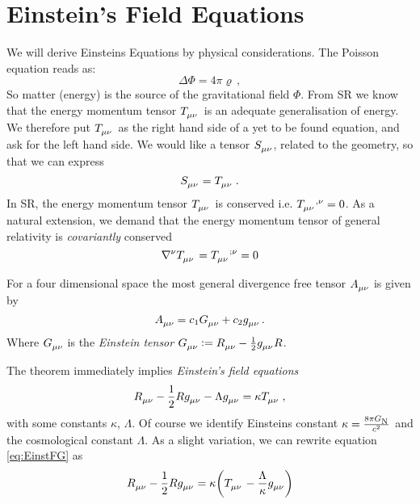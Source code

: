 \chapter{Einstein's Field Equations}
We will derive Einsteins Equations by physical considerations. The Poisson
equation reads as:
\begin{equation}
\Delta\Phi=4\pi\varrho\, ,
\end{equation}
So matter (energy) is the source of the gravitational field $\Phi$.  From SR we
know that the energy momentum tensor $\tensor{T}{_\mu_\nu}$ is an adequate
generalisation of energy.
We therefore put $\tensor{T}{_\mu_\nu}$ as the right hand side of a yet to be
found equation, and ask for the left hand side. We would like a tensor
$\tensor{S}{_\mu_\nu}$, related to the geometry, so that we can express
\begin{equation}
\tensor{S}{_\mu_\nu}=\tensor{T}{_\mu_\nu}
\,.
\end{equation}
In SR, the energy momentum tensor $\tensor{T}{_\mu_\nu}$ is conserved i.e.
$\tensor{T}{_\mu_\nu^{,\nu}}=0$. As a natural extension, we demand that the
energy momentum tensor of general relativity is \emph{covariantly} conserved
\begin{equation}
\tensor{\nabla}{^\nu}\tensor{T}{_\mu_\nu}=\tensor{T}{_\mu_\nu^{;\nu}}=0
\end{equation}
\begin{theorem}[Lovelock]
For a four dimensional space
\footnotemark{} the most general divergence free tensor $\tensor{A}{_\mu_\nu}$ is
given by
\begin{equation}
\tensor{A}{_\mu_\nu}= c_1\tensor{G}{_\mu_\nu}+c_2\tensor{g}{_\mu_\nu}\, .
\end{equation}
Where $\tensor{G}{_\mu_\nu}$ is the \emph{Einstein tensor}
$\tensor{G}{_\mu_\nu}:=\tensor{R}{_\mu_\nu}-\frac{1}{2}\tensor{g}{_\mu_\nu}R$.
\end{theorem}
The theorem immediately implies \emph{Einstein's field equations}
\begin{equation}
\tensor{R}{_\mu_\nu}-\frac{1}{2}R\tensor{g}{_\mu_\nu}-\Lambda\tensor{g}{_\mu_\nu}
=\kappa\tensor{T}{_\mu_\nu}\, ,\label{eq:EinstFG}
\end{equation}
with some constants $\kappa$, $\Lambda$.
Of course we identify Einsteins constant $\kappa=\frac{8\pi
G\textsubscript{N}}{c^2}$ and the cosmological constant $\Lambda$. As a slight
variation, we can rewrite equation \eqref{eq:EinstFG} as
\begin{equation}
\tensor{R}{_\mu_\nu}-\frac{1}{2}R\tensor{g}{_\mu_\nu}
=\kappa\left(\tensor{T}{_\mu_\nu}-\frac{\Lambda}{\kappa}\tensor{g}{_\mu_\nu}\right)
\end{equation}
